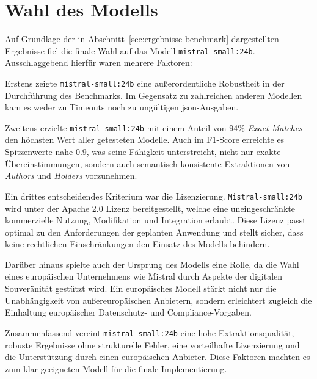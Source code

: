 
\section{Wahl des Modells}\label{sec:auswahl-modell-benchmark}

Auf Grundlage der in Abschnitt~\ref{sec:ergebnisse-benchmark} dargestellten Ergebnisse fiel die finale Wahl auf das Modell \texttt{mistral-small:24b}.
Ausschlaggebend hierfür waren mehrere Faktoren:

Erstens zeigte \texttt{mistral-small:24b} eine außerordentliche Robustheit in der Durchführung des Benchmarks.
Im Gegensatz zu zahlreichen anderen Modellen kam es weder zu Timeouts noch zu ungültigen \gls{json}-Ausgaben.

Zweitens erzielte \texttt{mistral-small:24b} mit einem Anteil von \num{94}\% \textit{Exact Matches} den höchsten Wert aller getesteten Modelle.
Auch im F1-Score erreichte es Spitzenwerte nahe \num{0.9}, was seine Fähigkeit unterstreicht, nicht nur exakte Übereinstimmungen, sondern auch semantisch konsistente Extraktionen von \textit{Authors} und \textit{Holders} vorzunehmen.

Ein drittes entscheidendes Kriterium war die Lizenzierung.
\texttt{Mistral-small:24b} wird unter der Apache 2.0 Lizenz bereitgestellt, welche eine uneingeschränkte kommerzielle Nutzung, Modifikation und Integration erlaubt.
Diese Lizenz passt optimal zu den Anforderungen der geplanten Anwendung und stellt sicher, dass keine rechtlichen Einschränkungen den Einsatz des Modells behindern.

Darüber hinaus spielte auch der Ursprung des Modells eine Rolle, da die Wahl eines europäischen Unternehmens wie Mistral durch Aspekte der digitalen Souveränität gestützt wird.
Ein europäisches Modell stärkt nicht nur die Unabhängigkeit von außereuropäischen Anbietern, sondern erleichtert zugleich die Einhaltung europäischer Datenschutz- und Compliance-Vorgaben.

Zusammenfassend vereint \texttt{mistral-small:24b} eine hohe Extraktionsqualität, robuste Ergebnisse ohne strukturelle Fehler, eine vorteilhafte Lizenzierung und die Unterstützung durch einen europäischen Anbieter.
Diese Faktoren machten es zum klar geeigneten Modell für die finale Implementierung.
